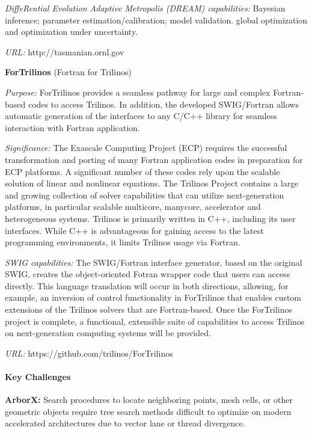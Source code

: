 {\it DiffeRential Evolution Adaptive Metropolis (DREAM) capabilities:}
Bayesian inference; parameter estimation/calibration; model validation.
global optimization and optimization under uncertainty.

{\it URL:} http://tasmanian.ornl.gov


{\bf ForTrilinos} (Fortran for Trilinos)

{\it Purpose:} ForTrilinos provides a seamless pathway for large and complex
Fortran-based codes to access Trilinos. In addition, the developed SWIG/Fortran
allows automatic generation of the interfaces to any C/C++ library for seamless
interaction with Fortran application.

{\it Significance:} The Exascale Computing Project (ECP) requires the successful
transformation and porting of many Fortran application codes in preparation for
ECP platforms. A significant number of these codes rely upon the scalable
solution of linear and nonlinear equations. The Trilinos Project contains
a large and growing collection of solver capabilities that can utilize
next-generation platforms, in particular scalable multicore, manycore,
accelerator and heterogeneous systems. Trilinos is primarily written in C++,
including its user interfaces. While C++ is advantageous for gaining access to
the latest programming environments, it limits Trilinos usage via Fortran.

{\it SWIG capabilities:} The SWIG/Fortran interface generator, based on the
original SWIG, creates the object-oriented Fotran wrapper code that users can
access directly. This language translation will occur in both directions,
allowing, for example, an inversion of control functionality in ForTrilinos
that enables custom extensions of the Trilinos solvers that are Fortran-based.
Once the ForTrilinos project is complete, a functional, extensible suite of
capabilities to access Trilinos on next-generation computing systems will be
provided.

{\it URL:} https://github.com/trilinos/ForTrilinos

\paragraph{Key Challenges}

\indent

{\bf ArborX:} Search procedures to locate neighboring points, mesh cells, or
other geometric objects require tree search methods difficult to optimize on
modern accelerated architectures due to vector lane or thread divergence.

